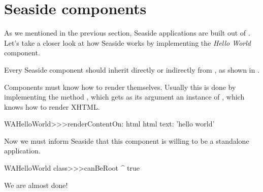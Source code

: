 \documentclass[a4paper,10pt,twoside]{book}
\begin{document}
\section{Seaside components}


As we mentioned in the previous section, Seaside applications are built out of \emph{.}
Let's take a closer look at how Seaside works by implementing the \emph{Hello World} component.

Every Seaside component should inherit directly or indirectly from , as shown in .


Components must know how to render themselves.
Usually this is done by implementing the method , which gets as its argument an instance of , which knows how to render XHTML.

\begin{code}{}
WAHelloWorld>>>renderContentOn: html
	html text: 'hello world'
\end{code}

\noindent
Now we must inform Seaside that this component is willing to be a standalone application. 


\begin{code}{}
WAHelloWorld class>>>canBeRoot
	^ true
\end{code}

\noindent
We are almost done!

\end{document}
